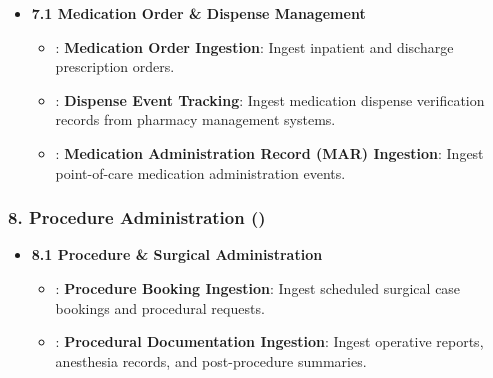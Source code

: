 \begin{itemize}

\item
\textbf{7.1 Medication Order \& Dispense Management}


\begin{itemize}

\item
\texttt{}: \textbf{Medication Order Ingestion}: Ingest inpatient and discharge prescription orders.



\item
\texttt{}: \textbf{Dispense Event Tracking}: Ingest medication dispense verification records from pharmacy management systems.



\item
\texttt{}: \textbf{Medication Administration Record (MAR) Ingestion}: Ingest point-of-care medication administration events.



\end{itemize}


\end{itemize}
\label{rad:enabling:322}
\subsubsection*{8. Procedure Administration (\texttt{})}
\label{rad:enabling:323}

\begin{itemize}

\item
\textbf{8.1 Procedure \& Surgical Administration}


\begin{itemize}

\item
\texttt{}: \textbf{Procedure Booking Ingestion}: Ingest scheduled surgical case bookings and procedural requests.



\item
\texttt{}: \textbf{Procedural Documentation Ingestion}: Ingest operative reports, anesthesia records, and post-procedure summaries.



\end{itemize}


\end{itemize}
\label{rad:enabling:327}
